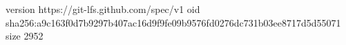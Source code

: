 version https://git-lfs.github.com/spec/v1
oid sha256:a9c163f0d7b9297b407ac16d9f9fe09b9576fd0276dc731b03ee8717d5d55071
size 2952
